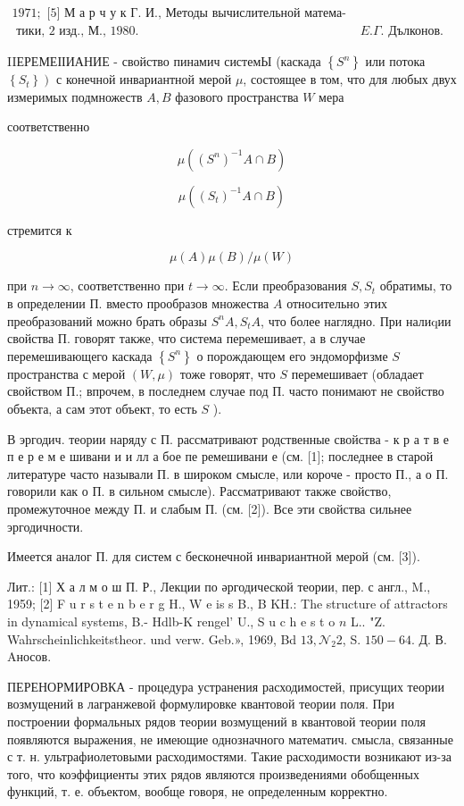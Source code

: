 \documentclass[10pt]{article}
\begin{document}
$\begin{array}{rrr}1971 ; \text { [5] М а р ч у к Г. И., Методы вычислительной матема- } \\ \text { тики, 2 изд., М., } 1980 . & E . \Gamma . \text { Дълконов. }\end{array}$

IIЕРЕМЕІІИАНИЕ - свойство пинамич системЫ (каскада $\left\{S^{n}\right\}$ или потока $\left.\left\{S_{t}\right\}\right)$ с конечной инвариантной мерой $\mu$, состоящее в том, что для любых двух измеримых подмножеств $A, B$ фазового пространства $W$ мера

соответственно

\[
\mu\left(\left(S^{n}\right)^{-1} A \cap B\right)
\]

\[
\mu\left(\left(S_{t}\right)^{-1} A \cap B\right)
\]

стремится к

\[
\mu(A) \mu(B) / \mu(W)
\]

при $n \rightarrow \infty$, соответственно при $t \rightarrow \infty$. Если преобразования $S, S_{t}$ обратимы, то в определении П. вместо прообразов множества $A$ относительно этих преобразований можно брать образы $S^{n} A, S_{t} A$, что более наглядно. При налиqии свойства П. говорят также, что система перемешивает, а в случае перемешивающего каскада $\left\{S^{n}\right\}$ о порождающем его эндоморфизме $S$ пространства с мерой $(W, \mu)$ тоже говорят, что $S$ перемешивает (обладает свойством П.; впрочем, в последнем случае под П. часто понимают не свойство объекта, а сам этот объект, то есть $S$ ).

В эргодич. теории наряду с П. рассматривают родственные свойства - к р а т в е п е р е м е шивани и и лл а бое пе ремешивани е (см. [1]; последнее в старой литературе часто называли П. в широком смысле, или короче - просто П., а о П. говорили как о П. в сильном смысле). Рассматривают также свойство, промежуточное между П. и слабым П. (см. [2]). Все эти свойства сильнее эргодичности.

Имеется аналог П. для систем с бесконечной инвариантной мерой (см. [3]).

Лит.: [1] Х а л м о ш П. Р., Лекции по әргодической теории, пер. с англ., M., 1959; [2] F u r s t e n b e r g H., W e is s B., B KH.: The structure of attractors in dynamical systems, B.- Hdlb-K rengel' U., S u c h e s t o $n$ L.. "Z. Wahrscheinlichkeitstheor. und verw. Geb.», 1969, Bd $13, \mathcal{N}_{2} 2$, S. $150-64$. Д. В. Aносов.

ПЕРЕНОРМИРОВКА - процедура устранения расходимостей, присущих теории возмущений в лагранжевой формулировке квантовой теории поля. При построении формальных рядов теории возмущений в квантовой теории поля появляются выражения, не имеющие однозначного математич. смысла, связанные с т. н. ультрафиолетовыми расходимостями. Такие расходимости возникают из-за того, что коэффициенты этих рядов являются произведениями обобщенных функций, т. е. объектом, вообще говоря, не определенным корректно.
\end{document}
